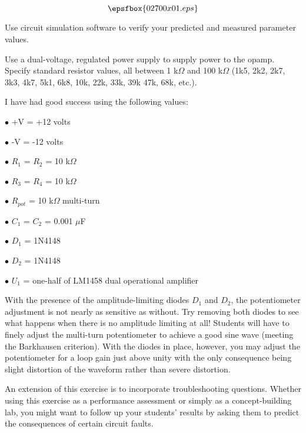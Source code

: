 

$$\epsfbox{02700x01.eps}$$

\vfil \eject






Use circuit simulation software to verify your predicted and measured parameter values.







Use a dual-voltage, regulated power supply to supply power to the opamp.  Specify standard resistor values, all between 1 k$\Omega$ and 100 k$\Omega$ (1k5, 2k2, 2k7, 3k3, 4k7, 5k1, 6k8, 10k, 22k, 33k, 39k 47k, 68k, etc.).

I have had good success using the following values:

\medskip
\item{$\bullet$} +V = +12 volts
\item{$\bullet$} -V = -12 volts
\item{$\bullet$} $R_1$ = $R_2$ = 10 k$\Omega$
\item{$\bullet$} $R_3$ = $R_4$ = 10 k$\Omega$
\item{$\bullet$} $R_{pot}$ = 10 k$\Omega$ multi-turn
\item{$\bullet$} $C_1$ = $C_2$ = 0.001 $\mu$F
\item{$\bullet$} $D_1$ = 1N4148
\item{$\bullet$} $D_2$ = 1N4148
\item{$\bullet$} $U_1$ = one-half of LM1458 dual operational amplifier
\medskip

With the presence of the amplitude-limiting diodes $D_1$ and $D_2$, the potentiometer adjustment is not nearly as sensitive as without.  Try removing both diodes to see what happens when there is no amplitude limiting at all!  Students will have to finely adjust the multi-turn potentiometer to achieve a good sine wave (meeting the Barkhausen criterion).  With the diodes in place, however, you may adjust the potentiometer for a loop gain just above unity with the only consequence being slight distortion of the waveform rather than severe distortion.

An extension of this exercise is to incorporate troubleshooting questions.  Whether using this exercise as a performance assessment or simply as a concept-building lab, you might want to follow up your students' results by asking them to predict the consequences of certain circuit faults.




